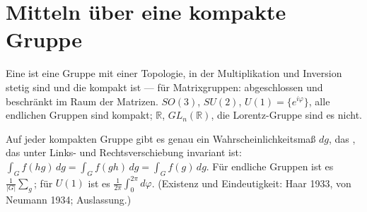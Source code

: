 \begin{merksatz}
\begin{center}
\begin{minipage}{0.88\textwidth}
\end{minipage}
\end{center}
\end{merksatz}

\section{Mitteln über eine kompakte Gruppe}

\begin{definition}
Eine  ist eine Gruppe mit einer Topologie, in der Multiplikation und Inversion stetig sind und die kompakt ist --- für Matrixgruppen: abgeschlossen und beschränkt im Raum der Matrizen. $SO(3)$, $SU(2)$, $U(1) = \{e^{i\varphi}\}$, alle endlichen Gruppen sind kompakt; $\mathbb R$, $GL_n(\mathbb R)$, die Lorentz-Gruppe sind es nicht.

Auf jeder kompakten Gruppe gibt es genau ein Wahrscheinlichkeitsmaß $dg$, das , das unter Links- und Rechtsverschiebung invariant ist: $\int_Gf(hg)\,dg = \int_Gf(gh)\,dg = \int_Gf(g)\,dg$. Für endliche Gruppen ist es $\frac1{|G|}\sum_g$; für $U(1)$ ist es $\frac1{2\pi}\int_0^{2\pi}d\varphi$. (Existenz und Eindeutigkeit: Haar 1933, von Neumann 1934; Auslassung.)
\end{definition}

